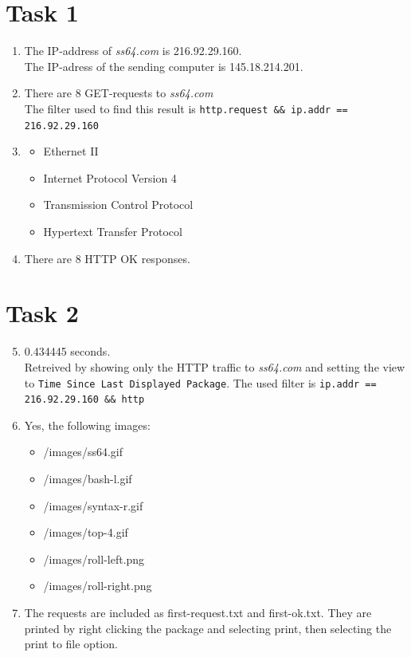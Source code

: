 \documentclass[12pt]{article}
\begin{document}
\maketitle
\section{Task 1}
\begin{enumerate}
    \item The IP-address of \emph{ss64.com} is 216.92.29.160. \\
        The IP-adress of the sending computer is 145.18.214.201.
    \item There are 8 GET-requests to \emph{ss64.com} \\
        The filter used to find this result is \verb|http.request && ip.addr == 216.92.29.160|
    \item
        \begin{itemize}
            \item Ethernet II
            \item Internet Protocol Version 4
            \item Transmission Control Protocol
            \item Hypertext Transfer Protocol
        \end{itemize}
    \item There are 8 HTTP OK responses.
\end{enumerate}
\clearpage
\section{Task 2}
\begin{enumerate}
    \setcounter{enumi}{4}
    \item 0.434445 seconds. \\
        Retreived by showing only the HTTP traffic to \emph{ss64.com} and setting the view to \verb|Time Since Last Displayed Package|. The used filter is \verb|ip.addr == 216.92.29.160 && http|
    \item Yes, the following images:
        \begin{itemize}
            \item /images/ss64.gif
            \item /images/bash-l.gif
            \item /images/syntax-r.gif
            \item /images/top-4.gif
            \item /images/roll-left.png
            \item /images/roll-right.png
        \end{itemize}
    \item The requests are included as first-request.txt and first-ok.txt. They are printed by right clicking the package and selecting print, then selecting the print to file option.
\end{enumerate}
\end{document}
